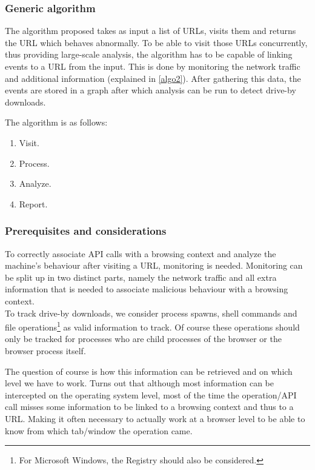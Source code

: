 
\subsubsection{Generic algorithm}

The algorithm proposed takes as input a list of URLs, visits them and returns the URL which behaves abnormally. To be able to visit those URLs concurrently, thus providing large-scale analysis, the algorithm has to be capable of linking events to a URL from the input. This is done by monitoring the network traffic and additional information (explained in \ref{algo2}). After gathering this data, the events are stored in a graph after which analysis can be run to detect drive-by downloads.

The algorithm is as follows:

\begin{enumerate}
\item Visit.
\item Process.
\item Analyze.
\item Report.
\end{enumerate}

\subsubsection{Prerequisites and considerations}

To correctly associate API calls with a browsing context and analyze the machine's behaviour after visiting a URL, monitoring is needed. Monitoring can be split up in two distinct parts, namely the network traffic and all extra information that is needed to associate malicious behaviour with a browsing context.\\

To track drive-by downloads, we consider process spawns, shell commands and file operations\footnote{For Microsoft Windows, the Registry should also be considered.} as valid information to track. Of course these operations should only be tracked for processes who are child processes of the browser or the browser process itself.\\

The question of course is how this information can be retrieved and on which level we have to work. Turns out that although most information can be intercepted on the operating system level, most of the time the operation/API call misses some information to be linked to a browsing context and thus to a URL. Making it often necessary to actually work at a browser level to be able to know from which tab/window the operation came.\\%


